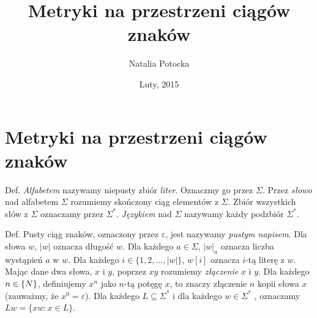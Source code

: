 \documentclass[]{article}
\title{Metryki na przestrzeni ciągów znaków}
\author{Natalia Potocka}
\date{Luty, 2015}
\begin{document}
\maketitle


\section{Metryki na przestrzeni ciągów
znaków}\label{metryki-na-przestrzeni-ciagow-znakow}

Def. \emph{Alfabetem} nazywamy niepusty zbiór \emph{liter}. Oznaczmy go
przez $\Sigma$. Przez \emph{słowo} nad alfabetem $\Sigma$ rozumiemy
skończony ciąg elementów z $\Sigma$. Zbiór wszystkich słów z $\Sigma$
oznaczamy przez $\Sigma^*$. \emph{Językiem} nad $\Sigma$ nazywamy każdy
podzbiór $\Sigma^*$.

Def. Pusty ciąg znaków, oznaczony przez $\varepsilon$, jest nazywamy
\emph{pustym napisem}. Dla słowa $w$, $|w|$ oznacza długość $w$. Dla
każdego $a \in \Sigma$, $|w|_a$ oznacza liczba wystąpień $a$ w $w$. Dla
każdego $i \in \{1,2, \ldots, |w|\}$, $w[i]$ oznacza $i$-tą literę z
$w$. Mając dane dwa słowa, $x$ i $y$, poprzez $xy$ rozumiemy
\emph{złączenie} $x$ i $y$. Dla każdego $n \in \mathbb\{N\}$,
definiujemy $x^n$ jako $n$-tą potęgę $x$, to znaczy złączenie $n$ kopii
słowa $x$ (zauważmy, że $x^0=\varepsilon$). Dla każdego
$L \subseteq \Sigma^*$ i dla każdego $w \in \Sigma^*$ , oznaczamy
$Lw = \{xw: x \in L\}$.
\end{document}
